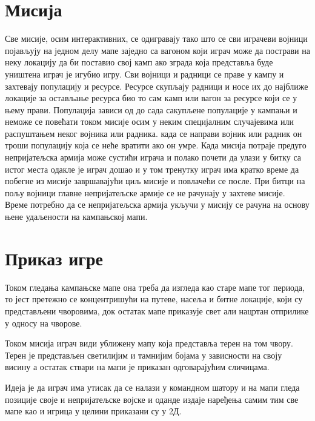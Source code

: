 \documentclass[11pt,a4paper]{article}
\begin{document}
\section{Мисија}
Све мисије, осим интерактивних, се одигравају тако што се сви играчеви војници појављују на једном делу мапе заједно са вагоном који играч може да пострави на неку локацију да би поставио свој камп ако зграда која представља буде уништена играч је игубио игру. Сви војници и радници се праве у кампу и захтевају популацију и ресурсе. Ресурсе скупљају радници и носе их до најближе локације за остављање ресурса  био то сам камп или вагон за ресурсе који се у њему прави. Популација зависи од до сада сакупљене популације  у кампањи и неможе се повећати током мисије осим у неким специјалним случајевима или распуштањем неког војника или радника. када се направи војник или радник он троши популацију која се неће вратити ако он умре. Када мисија потраје предуго непријатељска армија може сустићи играча и полако почети да улази у битку са истог места одакле је играч дошао и у том тренутку играч има кратко време да побегне из мисије завршавајући циљ мисије и повлачећи се после. При битци на пољу војници главне непријатељске армије се не рачунају у захтеве мисије. Време потребно да се непријатељска армија укључи у мисију се рачуна на основу њене удаљености на кампањској мапи.

\section{Приказ игре}
Током гледања кампањске мапе она треба да изгледа као старе мапе тог периода, то јест претежно се концентришући на путеве, насеља и битне локације, који су представљени чворовима, док остатак мапе приказује свет али нацртан отприлике у односу на чворове.

Током мисија играч види уближену мапу која представља терен на том чвору. Терен је представљен светилијим и тамнијим бојама у зависности на своју висину а остатак ствари на мапи је приказан одговарајућим сличицама. 

Идеја је да играч има утисак да се налази у командном шатору и на мапи гледа позиције своје и непријатељске војске и оданде издаје наређења самим тим све мапе као и игрица у целини приказани су у 2Д.
\end{document}
